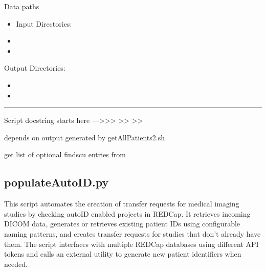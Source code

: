 \documentclass[letterpaper,10pt,english]{sphinxmanual}
\begin{document}
\sphinxAtStartPar
Data paths
\begin{itemize}
\item {} 
\sphinxAtStartPar
Input Directories:

\end{itemize}
\begin{itemize}
\item {} 
\sphinxAtStartPar
{}

\item {} 
\sphinxAtStartPar
{}

\end{itemize}

\sphinxAtStartPar
Output Directories:
\begin{itemize}
\item {} 
\sphinxAtStartPar
{}

\item {} 
\sphinxAtStartPar
{}

\end{itemize}


\bigskip\hrule\bigskip


\sphinxAtStartPar
Script docstring starts here —\textgreater{}\textgreater{}\textgreater{}
\textendash{}\textgreater{}\textgreater{}
\textendash{}\textgreater{}\textgreater{}

\sphinxAtStartPar
depends on output generated by getAllPatients2.sh

\sphinxAtStartPar
get list of optional findscu entries from 

\sphinxstepscope


\subsection{populateAutoID.py}
\label{\detokenize{Architecture/scripts/populateAutoID:populateautoid-py}}\label{\detokenize{Architecture/scripts/populateAutoID::doc}}
\sphinxAtStartPar
This script automates the creation of transfer requests for medical imaging studies by checking auto\sphinxhyphen{}ID enabled projects in REDCap. It retrieves incoming DICOM data, generates or retrieves existing patient IDs using configurable naming patterns, and creates transfer requests for studies that don’t already have them. The script interfaces with multiple REDCap databases using different API tokens and calls an external  utility to generate new patient identifiers when needed.
\end{document}
